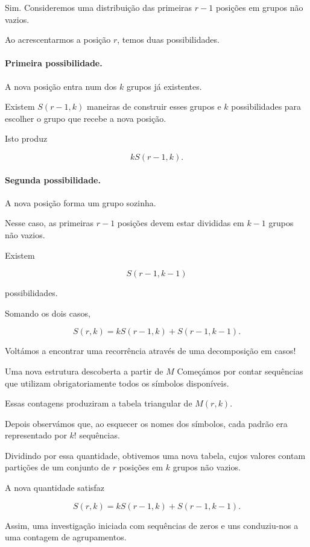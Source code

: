 \documentclass[11pt,a4paper,oneside]{book}
\begin{document}
Sim. Consideremos uma distribuição
das primeiras $r-1$ posições
em grupos não vazios.

Ao acrescentarmos a posição $r$,
temos duas possibilidades.

\paragraph{Primeira possibilidade.}

A nova posição entra num dos $k$
grupos já existentes.

Existem $S(r-1,k)$ maneiras
de construir esses grupos
e $k$ possibilidades para escolher
o grupo que recebe a nova posição.

Isto produz

\[
kS(r-1,k).
\]

\paragraph{Segunda possibilidade.}

A nova posição forma um grupo
sozinha.

Nesse caso, as primeiras $r-1$
posições devem estar divididas
em $k-1$ grupos não vazios.

Existem

\[
S(r-1,k-1)
\]

possibilidades.

Somando os dois casos,

\[
S(r,k)=kS(r-1,k)+S(r-1,k-1).
\]

Voltámos a encontrar uma recorrência
através de uma decomposição em casos!

\begin{descobertabox}{Uma nova estrutura descoberta a partir de $M$}
Começámos por contar sequências que
utilizam obrigatoriamente todos
os símbolos disponíveis.

Essas contagens produziram a tabela
triangular de $M(r,k)$.

Depois observámos que, ao esquecer
os nomes dos símbolos, cada padrão
era representado por $k!$ sequências.

Dividindo por essa quantidade,
obtivemos uma nova tabela, cujos
valores contam partições de um
conjunto de $r$ posições em
$k$ grupos não vazios.

A nova quantidade satisfaz

\[
S(r,k)=kS(r-1,k)+S(r-1,k-1).
\]

Assim, uma investigação iniciada
com sequências de zeros e uns
conduziu-nos a uma contagem
de agrupamentos.
\end{descobertabox}
\end{document}
